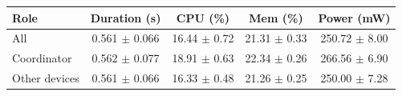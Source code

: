 \begin{tabular}{lcccc}
\hline
\textbf{Role} & \textbf{Duration (s)} & \textbf{CPU (\%)} & \textbf{Mem (\%)} & \textbf{Power (mW)} \\
\hline
All & 0.561 $\pm$ 0.066 & 16.44 $\pm$ 0.72 & 21.31 $\pm$ 0.33 & 250.72 $\pm$ 8.00 \\
Coordinator & 0.562 $\pm$ 0.077 & 18.91 $\pm$ 0.63 & 22.34 $\pm$ 0.26 & 266.56 $\pm$ 6.90 \\
Other devices & 0.561 $\pm$ 0.066 & 16.33 $\pm$ 0.48 & 21.26 $\pm$ 0.25 & 250.00 $\pm$ 7.28 \\
\hline
\end{tabular}
